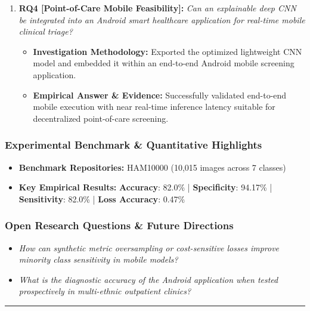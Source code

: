 \begin{enumerate}[label=\textbf{\arabic*.}, leftmargin=*]
\begin{itemize}[leftmargin=1.5em]
  \end{itemize}
  \item \textbf{RQ4 [Point-of-Care Mobile Feasibility]:} \textit{Can an explainable deep CNN be integrated into an Android smart healthcare application for real-time mobile clinical triage?}
  \begin{itemize}[leftmargin=1.5em]
    \item \textbf{Investigation Methodology:} Exported the optimized lightweight CNN model and embedded it within an end-to-end Android mobile screening application.
    \item \textbf{Empirical Answer \& Evidence:} Successfully validated end-to-end mobile execution with near real-time inference latency suitable for decentralized point-of-care screening.
  \end{itemize}
\end{enumerate}

\subsubsection*{Experimental Benchmark \& Quantitative Highlights}
\begin{itemize}[leftmargin=*]
  \item \textbf{Benchmark Repositories:} HAM10000 (10,015 images across 7 classes)
  \item \textbf{Key Empirical Results:} \textbf{Accuracy}: 82.0\% \quad | \quad \textbf{Specificity}: 94.17\% \quad | \quad \textbf{Sensitivity}: 82.0\% \quad | \quad \textbf{Loss Accuracy}: 0.47\%
\end{itemize}

\subsubsection*{Open Research Questions \& Future Directions}
\begin{itemize}[leftmargin=*]
  \item \textit{How can synthetic metric oversampling or cost-sensitive losses improve minority class sensitivity in mobile models?}
  \item \textit{What is the diagnostic accuracy of the Android application when tested prospectively in multi-ethnic outpatient clinics?}
\end{itemize}
\vspace{0.8em}\hrule\vspace{1.2em}
